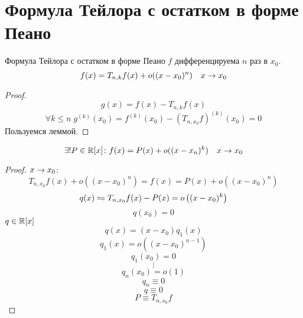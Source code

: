 ﻿\section{Формула Тейлора с остатком в форме Пеано}

\begin{theorem}{Формула Тейлора с остатком в форме Пеано}
$f$ дифференцируема $n$ раз в $x_0$.
$$f(x) = T_{n, k} f(x) + o((x - x_0)^n) \quad x \rightarrow x_0$$
\end{theorem}
\begin{proof}
$$g(x) = f(x) - T_{n, k} f(x)$$
$$\forall k \leqslant n\; g^{(k)} (x_0) = f^{(k)} (x_0) - \left(T_{n, x_0} f\right)^{(k)} (x_0) = 0$$
Пользуемся леммой.
\end{proof}

\begin{conseq}
$$\exists! P \in \mathbb{R}[x]\colon f(x) = P(x) + o((x - x_n)^k) \quad x \rightarrow x_0$$
\end{conseq}
\begin{proof}
$x \rightarrow x_0$:
$$T_{n, x_0} f(x) + o\left((x-x_0)^n\right) = f(x) = P(x) + o\left((x-x_0)^n\right)$$
$$q(x) \leftrightharpoons T_{n, x_0} f(x) - P(x) = o\left((x-x_0)^k\right)$$
$$q(x_0) = 0$$
$q \in \mathbb{R}[x]$
$$q(x) = (x - x_0) q_1(x)$$
$$q_1(x) = o\left((x - x_0)^{n-1}\right)$$
$$q_1(x_0) = 0$$
$$\vdots$$
$$q_n(x_0) = o(1)$$
$$q_n \equiv 0$$
$$q \equiv 0$$
$$P \equiv T_{n, x_0} f$$
\end{proof}

